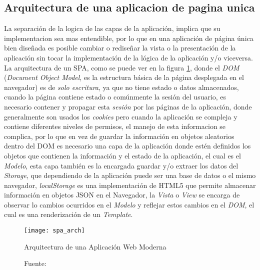 
\subsection{Arquitectura de una aplicacion de pagina unica}


La separación de la logica de las capas de la aplicación, implica que su implementacion sea mas entendible, por lo que en una aplicación de página única bien diseñada es posible cambiar o rediseñar la vista o la presentación de la aplicación sin tocar la implementación de la lógica de la aplicación y/o viceversa.\\

La arquitectura de un SPA, como se puede ver en la figura \ref{fig:spa_arch}, donde el \emph{DOM} (\emph{Document Object Model}, es la estructura básica de la página desplegada en el navegador) es de \emph{solo escritura}, ya que no tiene estado o datos almacenados, cuando la página contiene estado o comúnmente la sesión del usuario, es necesario contener y propagar esta \emph{sesión} por las páginas de la aplicación, donde generalmente son usados los \emph{cookies} pero cuando la aplicación se compleja y contiene diferentes niveles de permisos, el manejo de esta informacion se complica, por lo que en vez de guardar la información en objetos aleatorios dentro del DOM es necesario una capa de la aplicación donde estén definidos los objetos que contienen la información y el estado de la aplicación, el cual es el \emph{Modelo}, esta capa también es la encargada guardar y/o extraer los datos del \emph{Storage}, que dependiendo de la aplicación puede ser una base de datos o el mismo navegador, \emph{localStorage} es una implementación de HTML5 que permite almacenar información en objetos JSON en el Navegador, la \emph{Vista} o \emph{View} se encarga de observar lo cambios ocurridos en el \emph{Modelo} y reflejar estos cambios en el \emph{DOM}, el cual es una renderización de un \emph{Template}.\\

\begin{figure}[H]
  \begin{center}
    \texttt{[image: spa\_arch]}
    \caption[SPA Architecture ]{Arquitectura de una Aplicación Web Moderna}
    \label{fig:spa_arch}
    \caption*{Fuente: \cite{xp_addison} }
  \end{center}
\end{figure}


